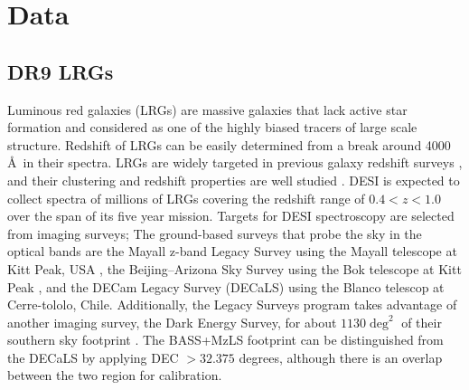 \section{Data}
\label{sec:data}
\subsection{DR9 LRGs}
Luminous red galaxies (LRGs) are massive galaxies that lack active star formation and considered as one of the highly biased tracers of large scale structure. Redshift of LRGs can be easily determined from  a break around 4000 \AA~in their spectra. LRGs are widely targeted in previous galaxy redshift surveys , and their clustering and redshift properties are well studied . DESI is expected to collect spectra of millions of LRGs covering the redshift range of $0.4<z<1.0$ over the span of its five year mission. Targets for DESI spectroscopy are selected from imaging surveys; The ground-based surveys that probe the sky in the optical bands are the Mayall z-band Legacy Survey using the Mayall telescope at Kitt Peak, USA , the Beijing–Arizona Sky Survey using the Bok telescope at Kitt Peak , and the DECam Legacy Survey (DECaLS) using the Blanco telescop at Cerre-tololo, Chile. Additionally, the Legacy Surveys program takes advantage of another imaging survey, the Dark Energy Survey, for about $1130 \deg^{2}$ of their southern sky footprint . The BASS+MzLS footprint can be distinguished from the DECaLS by applying DEC $> 32.375$ degrees, although there is an overlap between the two region for calibration. 


